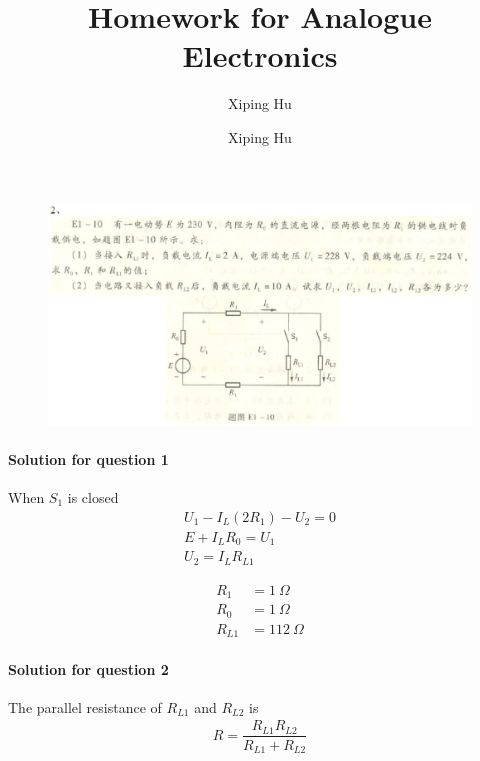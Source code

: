 \documentclass{article}
\author{Xiping Hu}
\author{Xiping Hu}
\affil{http://thehxp.tech/}
\title{Homework for Analogue Electronics}
\begin{document}
\maketitle

\begin{figure}[H]
  \centering
  \includegraphics[width=\linewidth]{figures/2}
  \label{fig:}
\end{figure}

\paragraph{Solution for question 1}

When $S_1$ is closed
\begin{equation*}
  \begin{aligned}
    U_1 - I_L ( 2 R_1 ) - U_2 = 0 \\
    E + I_L R_0 = U_1 \\
    U_2 = I_L R_{L1}
  \end{aligned}
\end{equation*}

\begin{equation*}
  \begin{aligned}
    R_1 &= 1 \  \Omega \\
    R_0 &= 1 \  \Omega \\
    R_{L1} &= 112 \ \Omega
  \end{aligned}
\end{equation*}

\paragraph{Solution for question 2}

The parallel resistance of $R_{L1}$ and $R_{L2}$ is
\begin{equation*}
  \begin{aligned}
    R = \dfrac{R_{L1} R_{L2}}{R_{L1} + R_{L2}} 
  \end{aligned}
\end{equation*}
\end{document}
